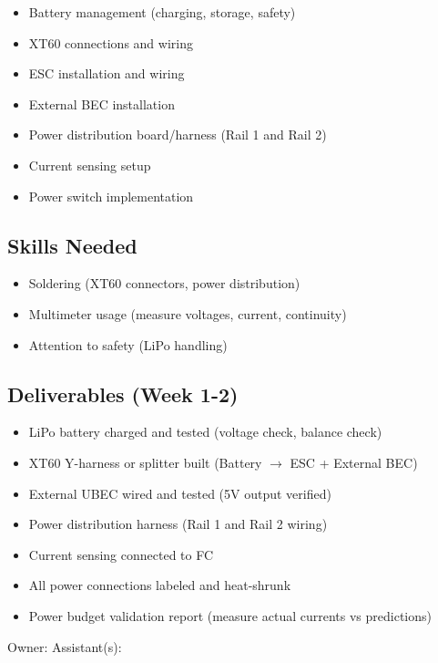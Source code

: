 \documentclass[11pt,letterpaper]{article}
\begin{document}
{\begin{itemize}
  \item Battery management (charging, storage, safety)
  \item XT60 connections and wiring
  \item ESC installation and wiring
  \item External BEC installation
  \item Power distribution board/harness (Rail 1 and Rail 2)
  \item Current sensing setup
  \item Power switch implementation
\end{itemize}

\subsection{Skills Needed}

\begin{itemize}
  \item Soldering (XT60 connectors, power distribution)
  \item Multimeter usage (measure voltages, current, continuity)
  \item Attention to safety (LiPo handling)
\end{itemize}

\subsection{Deliverables (Week 1-2)}

\begin{itemize}
  \item LiPo battery charged and tested (voltage check, balance check)
  \item XT60 Y-harness or splitter built (Battery $\rightarrow$ ESC + External BEC)
  \item External UBEC wired and tested (5V output verified)
  \item Power distribution harness (Rail 1 and Rail 2 wiring)
  \item Current sensing connected to FC
  \item All power connections labeled and heat-shrunk
  \item Power budget validation report (measure actual currents vs predictions)
\end{itemize}

Owner: \underline{\hspace{4.05cm}}  Assistant(s): \underline{\hspace{4.6499999999999995cm}}\par

}
\end{document}
